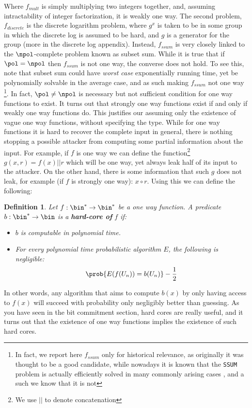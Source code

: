 \documentclass{article}
\newtheorem{definition}{Definition}
\begin{document}
Where $f_{mult}$ is simply multiplying two integers together, and, assuming intractability of integer factorization, it is weakly one way.
The second problem, $f_{discrete}$ is the discrete logarithm problem, where $g^x$ is taken to be in some group in which the discrete log is assumed
to be hard, and $g$ is a generator for the group (more in the discrete log appendix).
Instead, $f_{ssum}$ is very closely linked to the $\npol$-complete problem known as subset sum.
While it is true that if $\pol = \npol$ then $f_{ssum}$ is not one way, the converse does not hold. To see this, note that subset sum could have \textit{worst case} exponentially running time, yet be polynomially solvable in the average case, and as such making $f_{ssum}$ not one way
\footnote{In fact, we
    report here $f_{ssum}$ only for historical relevance, as originally it was thought to be a good candidate, while nowadays
    it is known that the \texttt{SSUM} problem is actually efficiently solved in many commonly arising cases \cite{lagariasSolvingLowdensitySubset1985}, and a such we know that it is not}.
In fact, $\pol \neq \npol$ is necessary but not sufficient condition for one way functions to exist.
It turns out \cite{goldreichFoundationsCryptographyVol2007} that strongly one way functions exist if and only if weakly one way functions do. This justifies our assuming only the existence of vague one way functions, without specifying the type.
While for one way functions it is hard to recover the complete input in general, there is nothing stopping a possible attacker from computing some partial information about the input.
For example, if $f$ is one way we can define the function\footnote{We use $||$ to denote concatenation} $g(x, r) = f(x) || r$ which will be one way, yet always leak half of its input to the attacker.
On the other hand, there is some information that such $g$ does not leak, for example (if $f$ is strongly one way): $x \circ r$.
Using this we can define the following:
\begin{definition}
    Let $f: \bin^* \to \bin^*$ be a one way function. A predicate $b: \bin^* \to \bin$ is
    a \textbf{hard-core of} $f$ if:
    \begin{itemize}
        \item $b$ is computable in polynomial time.
        \item For every polynomial time probabilistic algorithm $E$, the following is negligible:
              \[ \prob{E(f(U_n)) = b(U_n)} - \frac{1}{2} \]
    \end{itemize}
\end{definition}
In other words, any algorithm that aims to compute $b(x)$ by only having access to $f(x)$ will succeed with probability
only negligibly better than guessing. As you have seen in the bit commitment section, hard cores are really useful, and it turns out \cite{goldreichFoundationsCryptographyVol2007} that the existence of one way functions implies the existence of such hard cores.
\end{document}
